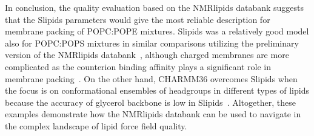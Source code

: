 \documentclass[fleqn,10pt]{wlscirep}
\begin{document}
In conclusion, the quality evaluation based on the NMRlipids databank suggests that the Slipids parameters would give the most reliable description for membrane packing of POPC:POPE mixtures. Slipids was a relatively good model also for POPC:POPS mixtures in similar comparisons utilizing the preliminary version of the NMRlipids databank~\cite{antila22b}, although charged membranes are more complicated as the counterion binding affinity plays a significant role in membrane packing~\cite{antila19}. On the other hand, CHARMM36 overcomes Slipids when the focus is on conformational ensembles of headgroups  in different types of lipids because the accuracy of glycerol backbone is low in Slipids~\cite{bacle21}. Altogether, these examples demonstrate how the NMRlipids databank can be used to navigate in the complex landscape of lipid force field quality.








\end{document}
